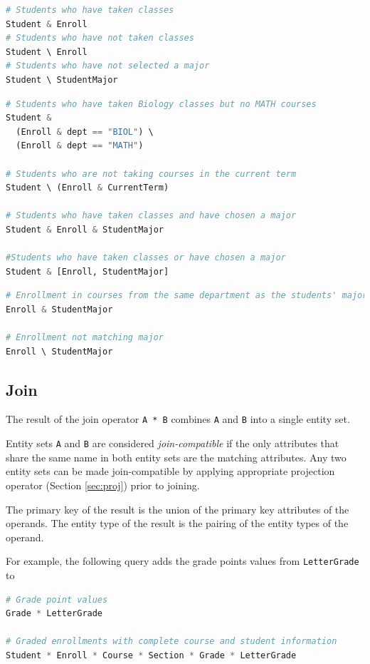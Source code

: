 \documentclass[letter,10pt]{article}
\begin{document}
\begin{lstlisting}[language=Python, caption={Restrictions by another entity.}, label={lst:res5}]
# Students who have taken classes
Student & Enroll
# Students who have not taken classes
Student \ Enroll
# Students who have not selected a major
Student \ StudentMajor
\end{lstlisting}

\begin{lstlisting}[language=Python, caption={Composite restrictions.}, label={lst:res6}]
# Students who have taken Biology classes but no MATH courses
Student & 
  (Enroll & dept == "BIOL") \ 
  (Enroll & dept == "MATH")

# Students who are not taking courses in the current term
Student \ (Enroll & CurrentTerm)

# Students who have taken classes and have chosen a major
Student & Enroll & StudentMajor 

#Students who have taken classes or have chosen a major
Student & [Enroll, StudentMajor]
\end{lstlisting}

\begin{lstlisting}[language=Python, caption={Avoiding unintended restrictions.}, label={lst:res7}]
# Enrollment in courses from the same department as the students' major
Enroll & StudentMajor

# Enrollment not matching major 
Enroll \ StudentMajor 
\end{lstlisting}

\subsection{Join}\label{sec:join}
The result of the join operator \lstinline$A * B$ combines \lstinline$A$ and \lstinline$B$ into a single entity set.

Entity sets \lstinline$A$ and \lstinline$B$ are considered \emph{join-compatible} if the only attributes that share the same name in both entity sets are the matching attributes.
Any two entity sets can be made join-compatible by applying appropriate projection operator (Section \ref{sec:proj}) prior to joining.

The primary key of the result is the union of the primary key attributes of the operands. 
The entity type of the result is the pairing of the entity types of the operand.  

For example, the following query adds the grade points values from \lstinline$LetterGrade$ to 
\begin{lstlisting}[language=Python, caption={Combining entities.}, label={lst:join1}]
# Grade point values
Grade * LetterGrade

# Graded enrollments with complete course and student information
Student * Enroll * Course * Section * Grade * LetterGrade
\end{lstlisting}
\end{document}
